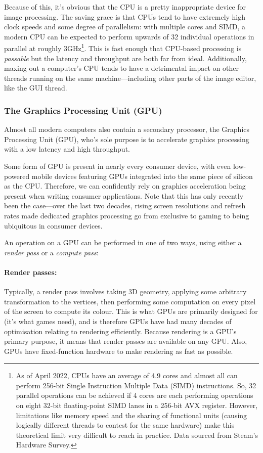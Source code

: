 \documentclass[12pt]{article}
\begin{document}
Because of this, it's obvious that the CPU is a pretty inappropriate device for image processing.
The saving grace is that CPUs tend to have extremely high clock speeds and some degree of
parallelism: with multiple cores and SIMD, a modern CPU can be expected to perform upwards of 32
individual operations in parallel at roughly 3GHz\footnote{As of April 2022, CPUs have an average of
4.9 cores and almost all can perform 256-bit Single Instruction Multiple Data (SIMD) instructions.
So, 32 parallel operations can be achieved if 4 cores are each performing operations on eight 32-bit
floating-point SIMD lanes in a 256-bit AVX register.  However, limitations like memory speed and the
sharing of functional units (causing logically different threads to contest for the same hardware)
make this theoretical limit very difficult to reach in practice.  Data sourced from Steam's Hardware
Survey.}.  This is fast enough that CPU-based processing is \emph{passable} but the latency and
throughput are both far from ideal.  Additionally, maxing out a computer's CPU tends to have a
detrimental impact on other threads running on the same machine---including other parts of the image
editor, like the GUI thread.

\subsubsection{The Graphics Processing Unit (GPU)}\label{sec:gpu}

Almost all modern computers also contain a secondary processor, the Graphics Processing Unit (GPU),
who's sole purpose is to accelerate graphics processing with a low latency and high throughput.

Some form of GPU is present in nearly every consumer device, with even low-powered mobile devices
featuring GPUs integrated into the same piece of silicon as the CPU.  Therefore, we can confidently
rely on graphics acceleration being present when writing consumer applications.  Note that this has
only recently been the case---over the last two decades, rising screen resolutions and refresh
rates made dedicated graphics processing go from exclusive to gaming to being ubiquitous in consumer
devices.

An operation on a GPU can be performed in one of two ways, using either a \emph{render pass} or
a \emph{compute pass}:

\paragraph{Render passes:} Typically, a render pass involves taking 3D geometry, applying some
arbitrary transformation to the vertices, then performing some computation on every pixel of the
screen to compute its colour.  This is what GPUs are primarily designed for (it's what games need),
and is therefore GPUs have had many decades of optimisation relating to rendering efficiently.
Because rendering is a GPU's primary purpose, it means that render passes are available on any GPU.
Also, GPUs have fixed-function hardware to make rendering as fast as possible.
\end{document}
